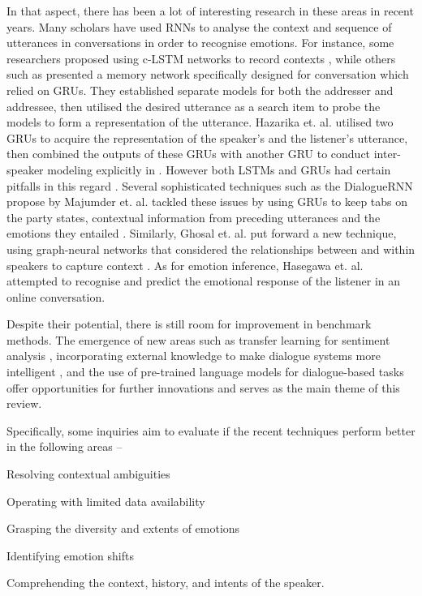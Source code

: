 In that aspect, there has been a lot of interesting research in these areas in recent years. Many scholars have used RNNs to analyse the context and sequence of utterances in conversations in order to recognise emotions. For instance, some researchers proposed using c-LSTM networks to record contexts \cite{poria-etal-2017-context}, while others such as \cite{Hazarika2018ConversationalMN} presented a memory network specifically designed for conversation which relied on GRUs. They established separate models for both the addresser and addressee, then utilised the desired utterance as a search item to probe the models to form a representation of the utterance. Hazarika et. al. utilised two GRUs to acquire the representation of the speaker's and the listener's utterance, then combined the outputs of these GRUs with another GRU to conduct inter-speaker modeling explicitly in \cite{hazarika-etal-2018-icon}. However both LSTMs and GRUs had certain pitfalls in this regard \cite{Bradbury2016QuasiRecurrentNN}. Several sophisticated techniques such as the DialogueRNN propose by Majumder et. al. tackled these issues by using GRUs to keep tabs on the party states, contextual information from preceding utterances and the emotions they entailed \cite{Majumder2018DialogueRNNAA}. Similarly, Ghosal et. al. put forward a new technique, using graph-neural networks that considered the relationships between and within speakers to capture context \cite{Ghosal2019DialogueGCNAG}. As for emotion inference, Hasegawa et. al. \cite{hasegawa-etal-2013-predicting} attempted to recognise and predict the emotional response of the listener in an online conversation. 

Despite their potential, there is still room for improvement in benchmark methods. The emergence of new areas such as transfer learning for sentiment analysis \cite{DavalFrerot2018EpitaAS}, incorporating external knowledge to make dialogue systems more intelligent \cite{Ma2020ASO}, and the use of pre-trained language models for dialogue-based tasks \cite{Bao2019PLATOPD} offer opportunities for further innovations and serves as the main theme of this review.

Specifically, some inquiries aim to evaluate if the recent techniques perform better in the following areas --
\begin{enumerate*}
    \item Resolving contextual ambiguities
    \item Operating with limited data availability
    \item Grasping the diversity and extents of emotions
    \item Identifying emotion shifts
    \item Comprehending the context, history, and intents of the speaker.
\end{enumerate*}

